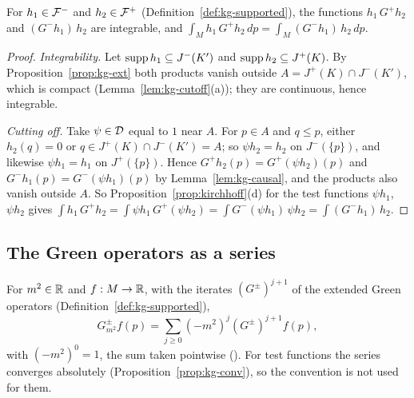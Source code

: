 \begin{proposition}\label{prop:kg-adj}
For $h_1\in\mathcal F^-$ and $h_2\in\mathcal F^+$ (Definition~\ref{def:kg-supported}), the functions $h_1\,G^+h_2$
and $(G^-h_1)\,h_2$ are integrable, and $\int_Mh_1\,G^+h_2\,dp=\int_M(G^-h_1)\,h_2\,dp$.
\end{proposition}
\begin{proof}
\emph{Integrability.} Let $\operatorname{supp} h_1\subseteq J^-(K')$ and $\operatorname{supp} h_2\subseteq J^+(K)$. By
Proposition~\ref{prop:kg-ext} both products vanish outside $A=J^+(K)\cap J^-(K')$, which is compact
(Lemma~\ref{lem:kg-cutoff}(a)); they are continuous, hence integrable.

\emph{Cutting off.} Take $\psi\in\mathcal D$ equal to $1$ near $A$. For $p\in A$ and $q\le p$, either
$h_2(q)=0$ or $q\in J^+(K)\cap J^-(K')=A$; so $\psi h_2=h_2$ on $J^-(\{p\})$, and likewise $\psi
h_1=h_1$ on $J^+(\{p\})$. Hence $G^+h_2(p)=G^+(\psi h_2)(p)$ and $G^-h_1(p)=G^-(\psi h_1)(p)$ by
Lemma~\ref{lem:kg-causal}, and the  products also vanish outside $A$. So
Proposition~\ref{prop:kirchhoff}(d) for the test functions $\psi h_1$, $\psi h_2$ gives
$\int h_1\,G^+h_2=\int\psi h_1\,G^+(\psi h_2)=\int G^-(\psi h_1)\,\psi h_2=\int(G^-h_1)\,h_2$.
\end{proof}

\subsection{The Green operators as a series}

\begin{definition}\label{def:kg-series}
For $m^2\in\mathbb R$ and $f:M\to\mathbb R$, with the iterates $(G^\pm)^{j+1}$ of the extended Green operators
(Definition~\ref{def:kg-supported}),
\[
G^\pm_{m^2}f(p)=\sum_{j\ge0}(-m^2)^j(G^\pm)^{j+1}f(p),
\]
with $(-m^2)^0=1$, the sum taken pointwise (). For test functions the series converges absolutely (Proposition~\ref{prop:kg-conv}), so
the convention is not used for them.
\end{definition}

